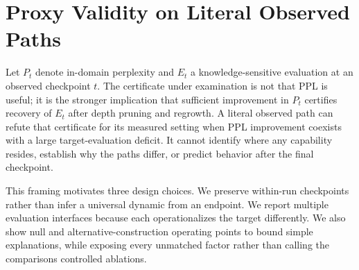 \section{Proxy Validity on Literal Observed Paths}
\label{sec:observation}

Let $P_t$ denote in-domain perplexity and $E_t$ a knowledge-sensitive
evaluation at an observed checkpoint $t$. The certificate under examination is
not that PPL is useful; it is the stronger implication that sufficient
improvement in $P_t$ certifies recovery of $E_t$ after depth pruning and
regrowth. A literal observed path can refute that certificate for its measured
setting when PPL improvement coexists with a large target-evaluation deficit.
It cannot identify where any capability resides, establish why the paths
differ, or predict behavior after the final checkpoint.

This framing motivates three design choices. We preserve within-run checkpoints
rather than infer a universal dynamic from an endpoint. We report multiple
evaluation interfaces because each operationalizes the target differently. We
also show null and alternative-construction operating points to bound simple
explanations, while exposing every unmatched factor rather than calling the
comparisons controlled ablations.
